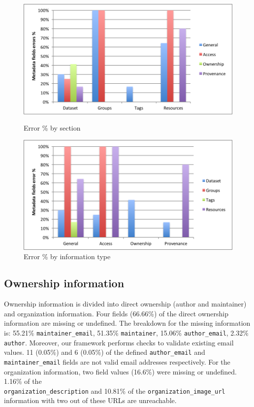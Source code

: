 \documentclass[runningheads,a4paper]{../../Util/LaTEX/llncs}
\begin{document}
\begin{figure}
\parbox{7cm}{\hspace*{-.2in}
\includegraphics[width=.95\linewidth]{metadata_noise_by_section.png}
\captionsetup{textfont=small,singlelinecheck=off,justification=centering}
\caption{Error \% by section}
\label{fig:metadata_noise_by_section}}
\qquad
\begin{minipage}{7cm}\hspace*{-.6in}
\includegraphics[width=.95\linewidth]{metadata_noise_by_metadata_type.png}
\captionsetup{textfont=small,singlelinecheck=off,justification=raggedright}
\caption{Error \% by information type}
\label{fig:metadata_noise_by_metadata_type}
\end{minipage}
\end{figure}

\subsection{Ownership information}
Ownership information is divided into direct ownership (author and maintainer) and organization information. Four fields (66.66\%) of the direct ownership information are missing or undefined. The breakdown for the missing information is: 55.21\% \texttt{maintainer\_email}, 51.35\% \texttt{maintainer}, 15.06\% \texttt{author\_email}, 2.32\% \texttt{author}. Moreover, our framework performs checks to validate existing email values. 11 (0.05\%) and 6 (0.05\%) of the defined \texttt{author\_email} and \texttt{maintainer\_email} fields are not valid email addresses respectively. For the organization information, two field values (16.6\%) were missing or undefined. 1.16\% of the \\\texttt{organization\_description} and 10.81\% of the \texttt{organization\-\_image\_url} information with two out of these URLs are unreachable.
\end{document}
